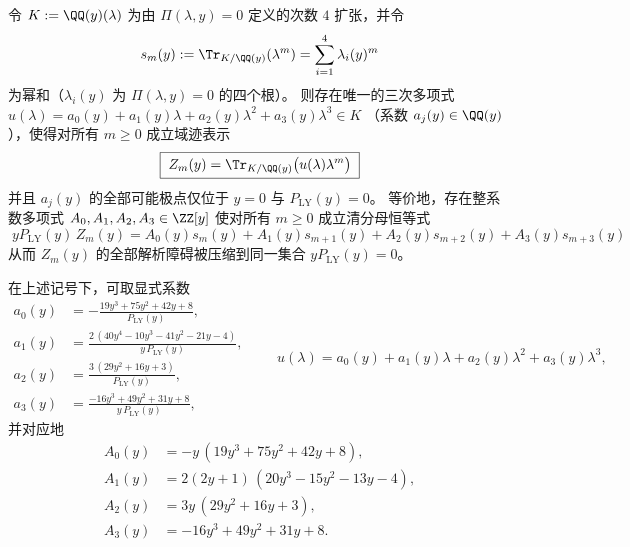 \begin{conclusion}[域迹表示与清分母整式恒等式：解析障碍压缩为 \(yP_{\mathrm{LY}}(y)=0\)]\label{con:xi-terminal-zm-field-trace-denominator-compression}
令 \(K:=\QQ(y)(\lambda)\) 为由 \(\Pi(\lambda,y)=0\) 定义的次数 \(4\) 扩张，并令
\[
s_m(y):=\Tr_{K/\QQ(y)}(\lambda^{m})=\sum_{i=1}^{4}\lambda_i(y)^{m}
\]
为幂和（\(\lambda_i(y)\) 为 \(\Pi(\lambda,y)=0\) 的四个根）。
则存在唯一的三次多项式
\(
u(\lambda)=a_0(y)+a_1(y)\lambda+a_2(y)\lambda^{2}+a_3(y)\lambda^{3}\in K
\)
（系数 \(a_j(y)\in\QQ(y)\)），使得对所有 \(m\ge 0\) 成立域迹表示
\[
\boxed{\;
Z_m(y)=\Tr_{K/\QQ(y)}\bigl(u(\lambda)\lambda^{m}\bigr)\;}
\]
并且 \(a_j(y)\) 的全部可能极点仅位于 \(y=0\) 与 \(P_{\mathrm{LY}}(y)=0\)。
等价地，存在整系数多项式 \(A_0,A_1,A_2,A_3\in\ZZ[y]\) 使对所有 \(m\ge 0\) 成立清分母恒等式
\[
\boxed{\;
yP_{\mathrm{LY}}(y)\,Z_m(y)
=A_0(y)s_m(y)+A_1(y)s_{m+1}(y)+A_2(y)s_{m+2}(y)+A_3(y)s_{m+3}(y)\;}
\]
从而 \(Z_m(y)\) 的全部解析障碍被压缩到同一集合 \(yP_{\mathrm{LY}}(y)=0\)。
\par
在上述记号下，可取显式系数
\[
\begin{aligned}
a_0(y)&=-\frac{19y^{3}+75y^{2}+42y+8}{P_{\mathrm{LY}}(y)},\\
a_1(y)&=\frac{2\,(40y^{4}-10y^{3}-41y^{2}-21y-4)}{y\,P_{\mathrm{LY}}(y)},\\
a_2(y)&=\frac{3\,(29y^{2}+16y+3)}{P_{\mathrm{LY}}(y)},\\
a_3(y)&=\frac{-16y^{3}+49y^{2}+31y+8}{y\,P_{\mathrm{LY}}(y)},
\end{aligned}
\qquad
u(\lambda)=a_0(y)+a_1(y)\lambda+a_2(y)\lambda^{2}+a_3(y)\lambda^{3},
\]
并对应地
\[
\begin{aligned}
A_0(y)&=-y\,(19y^{3}+75y^{2}+42y+8),\\
A_1(y)&=2(2y+1)\,(20y^{3}-15y^{2}-13y-4),\\
A_2(y)&=3y\,(29y^{2}+16y+3),\\
A_3(y)&=-16y^{3}+49y^{2}+31y+8.
\end{aligned}
\]
\end{conclusion}
